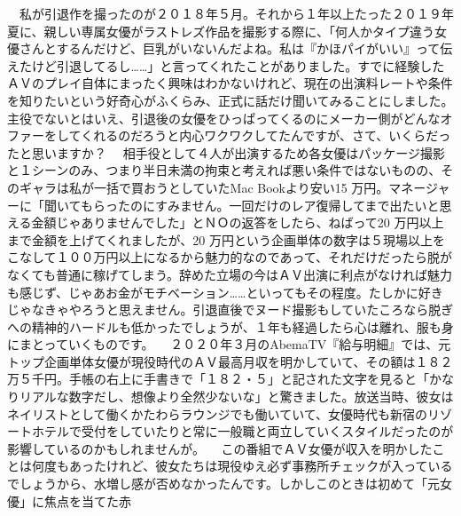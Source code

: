 \documentclass[12pt,UTF8]{ctexbook}
\begin{document}
　私が引退作を撮ったのが２０１８年５月。それから１年以上たった２０１９年夏に、親しい専属女優がラストレズ作品を撮影する際に、「何人かタイプ違う女優さんとするんだけど、巨乳がいないんだよね。私は『かほパイがいい』って伝えたけど引退してるし……」と言ってくれたことがありました。すでに経験したＡＶのプレイ自体にまったく興味はわかないけれど、現在の出演料レートや条件を知りたいという好奇心がふくらみ、正式に話だけ聞いてみることにしました。主役でないとはいえ、引退後の女優をひっぱってくるのにメーカー側がどんなオファーをしてくれるのだろうと内心ワクワクしてたんですが、さて、いくらだったと思いますか？
　相手役として４人が出演するため各女優はパッケージ撮影と１シーンのみ、つまり半日未満の拘束と考えれば悪い条件ではないものの、そのギャラは私が一括で買おうとしていたMac Bookより安い15
 万円。マネージャーに「聞いてもらったのにすみません。一回だけのレア復帰してまで出たいと思える金額じゃありませんでした」とＮＯの返答をしたら、ねばって20
 万円以上まで金額を上げてくれましたが、20
 万円という企画単体の数字は５現場以上をこなして１００万円以上になるから魅力的なのであって、それだけだったら脱がなくても普通に稼げてしまう。辞めた立場の今はＡＶ出演に利点がなければ魅力も感じず、じゃあお金がモチベーション……といってもその程度。たしかに好きじゃなきゃやろうと思えません。引退直後でヌード撮影もしていたころなら脱ぎへの精神的ハードルも低かったでしょうが、１年も経過したら心は離れ、服も身にまとっていくものです。
　２０２０年３月のAbemaTV『給与明細』では、元トップ企画単体女優が現役時代のＡＶ最高月収を明かしていて、その額は１８２万５千円。手帳の右上に手書きで「１８２・５」と記された文字を見ると「かなりリアルな数字だし、想像より全然少ないな」と驚きました。放送当時、彼女はネイリストとして働くかたわらラウンジでも働いていて、女優時代も新宿のリゾートホテルで受付をしていたりと常に一般職と両立していくスタイルだったのが影響しているのかもしれませんが。
　この番組でＡＶ女優が収入を明かしたことは何度もあったけれど、彼女たちは現役ゆえ必ず事務所チェックが入っているでしょうから、水増し感が否めなかったんです。しかしこのときは初めて「元女優」に焦点を当てた赤
\end{document}
